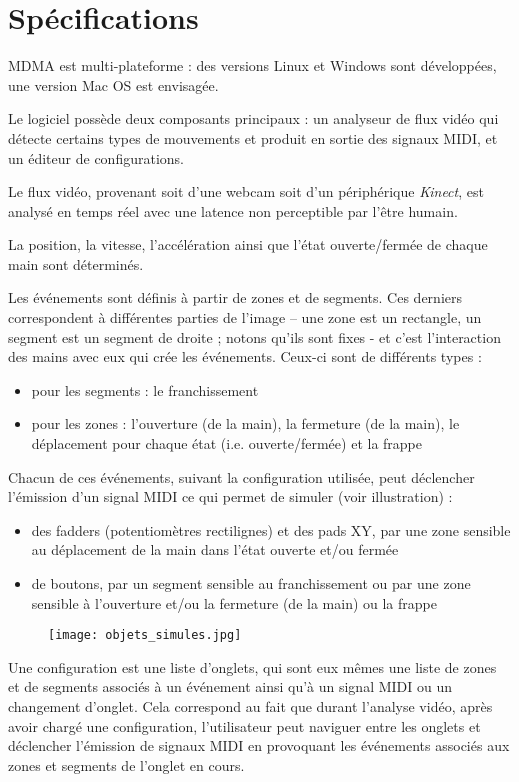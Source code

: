 \section{Spécifications}
\par MDMA est multi-plateforme : des versions Linux et Windows sont développées, une version Mac OS est envisagée.
\par Le logiciel possède deux composants principaux : un analyseur de flux vidéo qui détecte certains types de mouvements et produit en sortie des signaux MIDI, et un éditeur de configurations.
\par Le flux vidéo, provenant soit d'une webcam soit d'un périphérique \emph{Kinect}, est analysé en temps réel avec une latence non perceptible par l'être humain.
\par La position, la vitesse, l'accélération ainsi que l'état ouverte/fermée de chaque main sont déterminés.
\par Les événements sont définis à partir de zones et de segments. Ces derniers correspondent à différentes parties de l'image – une zone est un rectangle, un segment est un segment de droite ; notons qu'ils sont fixes - et c'est l'interaction des mains avec eux qui crée les événements. Ceux-ci sont de différents types :
\begin{itemize}
    \item pour les segments : le franchissement
    \item pour les zones : l'ouverture (de la main), la fermeture (de la main), le déplacement pour chaque état (i.e. ouverte/fermée) et la frappe
\end{itemize}
\par Chacun de ces événements, suivant la configuration utilisée, peut déclencher l'émission d'un signal MIDI ce qui permet de simuler (voir illustration) :
\begin{itemize}
    \item des fadders (potentiomètres rectilignes) et des pads XY, par une zone sensible au déplacement de la main dans l'état ouverte et/ou fermée
    \item de boutons, par un segment sensible au franchissement ou par une zone sensible à l'ouverture et/ou la fermeture (de la main) ou la frappe
\end{itemize}
\begin{figure}
	\centering
	\texttt{[image: objets\_simules.jpg]}
\end{figure}
\par Une configuration est une liste d'onglets, qui sont eux mêmes une liste de zones et de segments associés à un événement ainsi qu'à un signal MIDI ou un changement d'onglet. Cela correspond au fait que durant l'analyse vidéo, après avoir chargé une configuration, l'utilisateur peut naviguer entre les onglets et déclencher l'émission de signaux MIDI en provoquant les événements associés aux zones et segments de l'onglet en cours.
